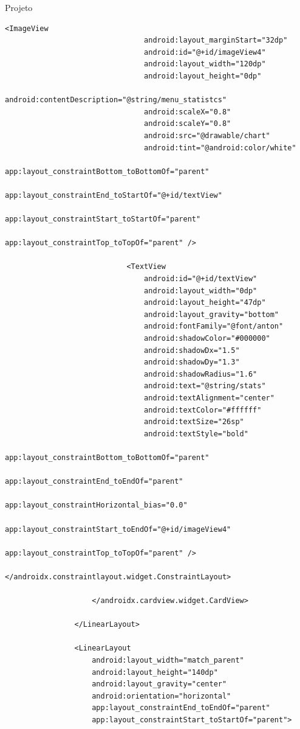 \documentclass[
	12pt,				%
	openright,			%
	twoside,			%
	a4paper,			%
	english,			%
	french,				%
	spanish,			%
	brazil				%
	]{abntex2}
\begin{document}
\begin{chapter}{Projeto}
\begin{lstlisting}[numbers=none,
basicstyle=\small,
caption={Fragment Main.xml},
title={Fragment Main.xml},
xleftmargin=4pt,
label={fragment_main.xml}]
                            <ImageView
                                android:layout_marginStart="32dp"
                                android:id="@+id/imageView4"
                                android:layout_width="120dp"
                                android:layout_height="0dp"
                                android:contentDescription="@string/menu_statistcs"
                                android:scaleX="0.8"
                                android:scaleY="0.8"
                                android:src="@drawable/chart"
                                android:tint="@android:color/white"
                                app:layout_constraintBottom_toBottomOf="parent"
                                app:layout_constraintEnd_toStartOf="@+id/textView"
                                app:layout_constraintStart_toStartOf="parent"
                                app:layout_constraintTop_toTopOf="parent" />

                            <TextView
                                android:id="@+id/textView"
                                android:layout_width="0dp"
                                android:layout_height="47dp"
                                android:layout_gravity="bottom"
                                android:fontFamily="@font/anton"
                                android:shadowColor="#000000"
                                android:shadowDx="1.5"
                                android:shadowDy="1.3"
                                android:shadowRadius="1.6"
                                android:text="@string/stats"
                                android:textAlignment="center"
                                android:textColor="#ffffff"
                                android:textSize="26sp"
                                android:textStyle="bold"
                                app:layout_constraintBottom_toBottomOf="parent"
                                app:layout_constraintEnd_toEndOf="parent"
                                app:layout_constraintHorizontal_bias="0.0"
                                app:layout_constraintStart_toEndOf="@+id/imageView4"
                                app:layout_constraintTop_toTopOf="parent" />
                        </androidx.constraintlayout.widget.ConstraintLayout>

                    </androidx.cardview.widget.CardView>

                </LinearLayout>

                <LinearLayout
                    android:layout_width="match_parent"
                    android:layout_height="140dp"
                    android:layout_gravity="center"
                    android:orientation="horizontal"
                    app:layout_constraintEnd_toEndOf="parent"
                    app:layout_constraintStart_toStartOf="parent">


\end{lstlisting}
\end{chapter}
\end{document}
